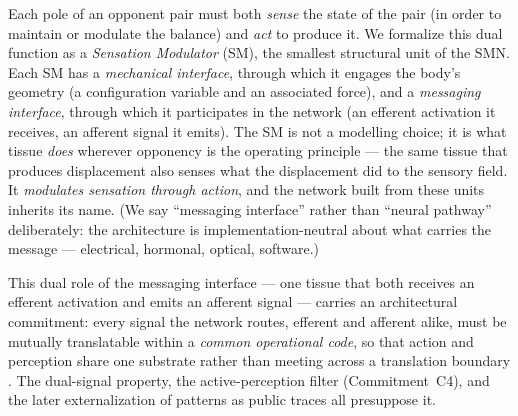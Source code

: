 \documentclass{article}
\begin{document}
Each pole of an opponent pair must both \emph{sense} the state of the
pair (in order to maintain or modulate the balance) and \emph{act} to
produce it.  We formalize this dual function as a \emph{Sensation
Modulator} (SM), the smallest structural unit of the SMN.  Each SM has
a \emph{mechanical interface}, through which it engages the body's
geometry (a configuration variable and an associated force), and a
\emph{messaging interface}, through which it participates in the
network (an efferent activation it receives, an afferent signal it
emits).  The SM is not a modelling choice; it is what tissue
\emph{does} wherever opponency is the operating principle --- the same
tissue that produces displacement also senses what the displacement
did to the sensory field.  It \emph{modulates sensation through
action}, and the network built from these units inherits its name.
(We say ``messaging interface'' rather than ``neural pathway''
deliberately: the architecture is implementation-neutral about what
carries the message --- electrical, hormonal, optical, software.)

This dual role of the messaging interface --- one tissue that both receives an
efferent activation and emits an afferent signal --- carries an architectural
commitment: every signal the network routes, efferent and afferent alike, must be
mutually translatable within a \emph{common operational code}, so that action and
perception share one substrate rather than meeting across a translation boundary
\citep{Prinz1990CommonCoding,Hommel2001TEC}.  The dual-signal property, the
active-perception filter (Commitment~C4), and the later externalization of patterns
as public traces all presuppose it.
\end{document}
